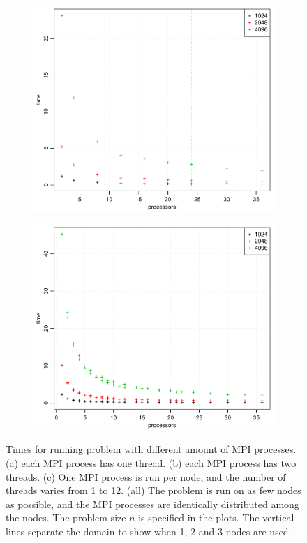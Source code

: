 \begin{figure}[h!]
\begin{subfigure}[b]{0.40\textwidth}
    \includegraphics[width=\textwidth]{./Figures/taskbTimeProc2.pdf}
    \caption{}
    \label{fig:time2}
  \end{subfigure}
  \quad
  \begin{subfigure}[b]{0.40\textwidth}
    \includegraphics[width=\textwidth]{./Figures/taskbTimeNodesTimesThreads.pdf}
    \caption{}
    \label{fig:time3}
  \end{subfigure}
  \vspace{-0.1\baselineskip}
  \caption{Times for running problem with different amount of MPI processes. (a) each MPI process has one thread. (b) each MPI process has two threads. (c) One MPI process is run per node, and the number of threads varies from 1 to 12. (all) The problem is run on as few nodes as possible, and the MPI processes are identically distributed among the nodes. The problem size $n$ is specified in the plots. The vertical lines separate the domain to show when 1, 2 and 3 nodes are used.}
  \label{fig:Times}
\end{figure}
%
